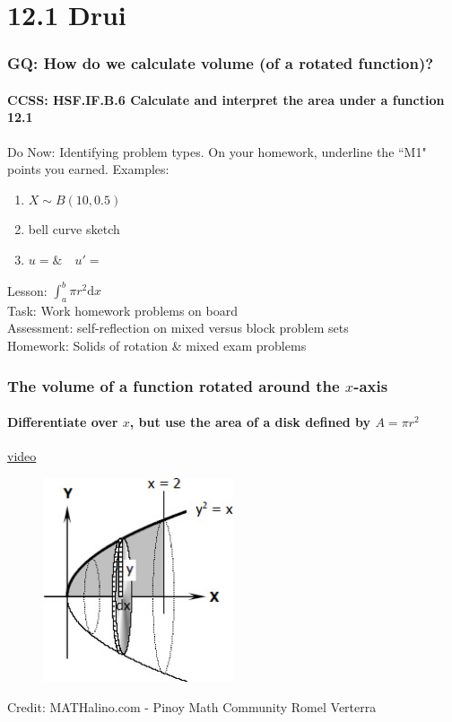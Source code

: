 \documentclass{beamer}
\begin{document}
  \section{12.1 Drui}
  \frame
  {
    \frametitle{GQ: How do we calculate volume (of a rotated function)?}
    \framesubtitle{CCSS: HSF.IF.B.6 Calculate and interpret the area under a function \qquad \alert{12.1}}

    \begin{block}{Do Now: Identifying problem types. On your homework, underline the ``M1" points you earned. Examples:}
      \begin{enumerate}
      \item $X \sim B(10, 0.5)$
      \item bell curve sketch
      \item $u= \& \quad u'=$
      \end{enumerate}
   \end{block}
    Lesson: $\displaystyle \int_a^b \pi r^2 \text{d}x$\\%
    Task: Work homework problems on board\\%
    Assessment: self-reflection on mixed versus block problem sets\\%
    Homework: Solids of rotation \& mixed exam problems
  }


  \frame
  {
    \frametitle{The volume of a function rotated around the $x$-axis}
    \framesubtitle{Differentiate over $x$, but use the area of a disk defined by $A=\pi r^2$}
  \href{https://www.youtube.com/watch?v=i4L5XoUBD_Q}{video}\\
  \begin{figure}[!ht]
      \centering
      \includegraphics[width=0.5\textwidth]{0413CW-paraboloid.jpg}
  \end{figure}
  \small{Credit: MATHalino.com - Pinoy Math Community Romel Verterra}
  }
\end{document}
